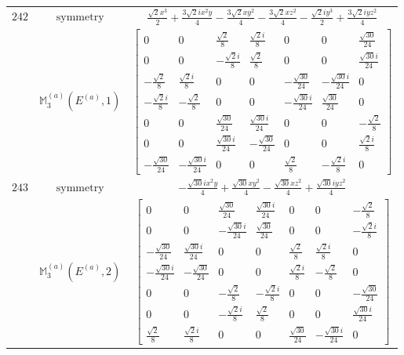 \documentclass[fleqn,8pt,landscape]{jsarticle}
\begin{document}
\begin{longtable}{ccc}
$ 242 $ & $ \text{symmetry} $ & $ \frac{\sqrt{2} x^{3}}{2} + \frac{3 \sqrt{2} i x^{2} y}{4} - \frac{3 \sqrt{2} x y^{2}}{4} - \frac{3 \sqrt{2} x z^{2}}{4} - \frac{\sqrt{2} i y^{3}}{2} + \frac{3 \sqrt{2} i y z^{2}}{4} $ \\
$  $ & $ \mathbb{M}_{3}^{(a)}(E^{(a)},1) $ & $ \begin{bmatrix} 0 & 0 & \frac{\sqrt{2}}{8} & \frac{\sqrt{2} i}{8} & 0 & 0 & \frac{\sqrt{30}}{24} \\ 0 & 0 & - \frac{\sqrt{2} i}{8} & \frac{\sqrt{2}}{8} & 0 & 0 & \frac{\sqrt{30} i}{24} \\ - \frac{\sqrt{2}}{8} & \frac{\sqrt{2} i}{8} & 0 & 0 & - \frac{\sqrt{30}}{24} & - \frac{\sqrt{30} i}{24} & 0 \\ - \frac{\sqrt{2} i}{8} & - \frac{\sqrt{2}}{8} & 0 & 0 & - \frac{\sqrt{30} i}{24} & \frac{\sqrt{30}}{24} & 0 \\ 0 & 0 & \frac{\sqrt{30}}{24} & \frac{\sqrt{30} i}{24} & 0 & 0 & - \frac{\sqrt{2}}{8} \\ 0 & 0 & \frac{\sqrt{30} i}{24} & - \frac{\sqrt{30}}{24} & 0 & 0 & \frac{\sqrt{2} i}{8} \\ - \frac{\sqrt{30}}{24} & - \frac{\sqrt{30} i}{24} & 0 & 0 & \frac{\sqrt{2}}{8} & - \frac{\sqrt{2} i}{8} & 0 \end{bmatrix} $ \\ \hline
$ 243 $ & $ \text{symmetry} $ & $ - \frac{\sqrt{30} i x^{2} y}{4} + \frac{\sqrt{30} x y^{2}}{4} - \frac{\sqrt{30} x z^{2}}{4} + \frac{\sqrt{30} i y z^{2}}{4} $ \\
$  $ & $ \mathbb{M}_{3}^{(a)}(E^{(a)},2) $ & $ \begin{bmatrix} 0 & 0 & \frac{\sqrt{30}}{24} & \frac{\sqrt{30} i}{24} & 0 & 0 & - \frac{\sqrt{2}}{8} \\ 0 & 0 & - \frac{\sqrt{30} i}{24} & \frac{\sqrt{30}}{24} & 0 & 0 & - \frac{\sqrt{2} i}{8} \\ - \frac{\sqrt{30}}{24} & \frac{\sqrt{30} i}{24} & 0 & 0 & \frac{\sqrt{2}}{8} & \frac{\sqrt{2} i}{8} & 0 \\ - \frac{\sqrt{30} i}{24} & - \frac{\sqrt{30}}{24} & 0 & 0 & \frac{\sqrt{2} i}{8} & - \frac{\sqrt{2}}{8} & 0 \\ 0 & 0 & - \frac{\sqrt{2}}{8} & - \frac{\sqrt{2} i}{8} & 0 & 0 & - \frac{\sqrt{30}}{24} \\ 0 & 0 & - \frac{\sqrt{2} i}{8} & \frac{\sqrt{2}}{8} & 0 & 0 & \frac{\sqrt{30} i}{24} \\ \frac{\sqrt{2}}{8} & \frac{\sqrt{2} i}{8} & 0 & 0 & \frac{\sqrt{30}}{24} & - \frac{\sqrt{30} i}{24} & 0 \end{bmatrix} $ \\ \hline

\end{longtable}
\end{document}
